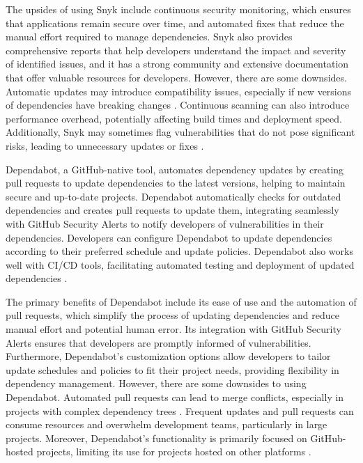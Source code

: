 \documentclass[sigconf]{acmart}
\begin{document}
The upsides of using Snyk include continuous security monitoring, which ensures that applications remain secure over time, and automated fixes that reduce the manual effort required to manage dependencies. Snyk also provides comprehensive reports that help developers understand the impact and severity of identified issues, and it has a strong community and extensive documentation that offer valuable resources for developers. However, there are some downsides. Automatic updates may introduce compatibility issues, especially if new versions of dependencies have breaking changes \cite{benischke2023updates}. Continuous scanning can also introduce performance overhead, potentially affecting build times and deployment speed. Additionally, Snyk may sometimes flag vulnerabilities that do not pose significant risks, leading to unnecessary updates or fixes \cite{snykFalsePositives2023}.

Dependabot, a GitHub-native tool, automates dependency updates by creating pull requests to update dependencies to the latest versions, helping to maintain secure and up-to-date projects. Dependabot automatically checks for outdated dependencies and creates pull requests to update them, integrating seamlessly with GitHub Security Alerts to notify developers of vulnerabilities in their dependencies. Developers can configure Dependabot to update dependencies according to their preferred schedule and update policies. Dependabot also works well with CI/CD tools, facilitating automated testing and deployment of updated dependencies \cite{dependabot2023}.

The primary benefits of Dependabot include its ease of use and the automation of pull requests, which simplify the process of updating dependencies and reduce manual effort and potential human error. Its integration with GitHub Security Alerts ensures that developers are promptly informed of vulnerabilities. Furthermore, Dependabot's customization options allow developers to tailor update schedules and policies to fit their project needs, providing flexibility in dependency management. However, there are some downsides to using Dependabot. Automated pull requests can lead to merge conflicts, especially in projects with complex dependency trees \cite{dependabotMerge2023}. Frequent updates and pull requests can consume resources and overwhelm development teams, particularly in large projects. Moreover, Dependabot's functionality is primarily focused on GitHub-hosted projects, limiting its use for projects hosted on other platforms \cite{dependabotScope2023}.
\end{document}
